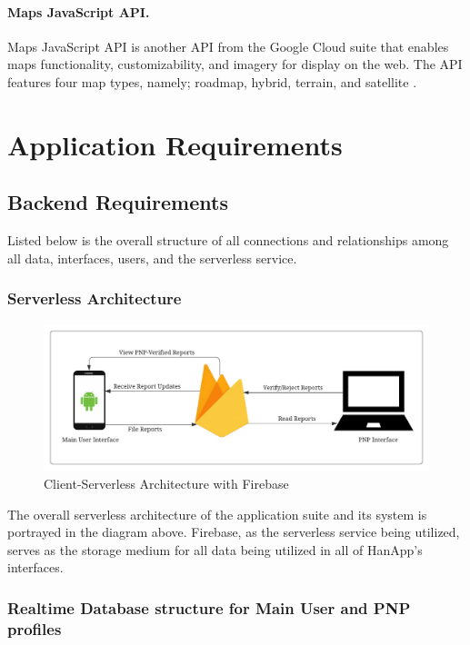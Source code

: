 \paragraph{Maps JavaScript API.} Maps JavaScript API is another API from the Google Cloud suite that enables maps functionality, customizability, and imagery for display on the web. The API features four map types, namely; roadmap, hybrid, terrain, and satellite \cite{javascriptSDK}.

\section{Application Requirements}

\subsection{Backend Requirements}

Listed below is the overall structure of all connections and relationships among all data, interfaces, users, and the serverless service. 

\subsubsection{Serverless Architecture}

\begin{figure}[!h]
    \centering
    \includegraphics[width=\textwidth]{figures/Chapter3/Chapt3_ServerlessArchitecture.jpeg}
    \caption{Client-Serverless Architecture with Firebase}
    \label{fig:ServerlessFirebase}
\end{figure}

The overall serverless architecture of the application suite and its system is portrayed in the diagram above. Firebase, as the serverless service being utilized, serves as the storage medium for all data being utilized in all of HanApp’s interfaces. 

\subsubsection{Realtime Database structure for Main User and PNP profiles}

